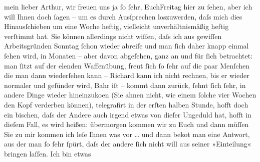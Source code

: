 \pstart{}mein lieber Arthur,\pend\vspace{0.5em}
\pstart
           wir freuen uns ja{ }ſo{ }ſehr, EuchFreitag hier zu{ }ſehen, aber ich will Ihnen doch{ }ſagen – um es durch
               Ausſprechen loszuwerden, daſs mich dies Hinausſchieben um eine Woche heftig,
               vielleicht unverhältnismäßig heftig verſtimmt hat. \label{OL450-1v}\label{OL450-1h}Sie können allerdings nicht wiſſen, {\pb}daſs ich aus gewiſſen
               Arbeitsgründen Sonntag{ }ſchon wieder abreiſe und man{ }ſich daher knapp
               einmal{ }ſehen wird, in Monaten – aber davon abgeſehen, ganz an und für{ }ſich
               betrachtet: man{ }ſitzt auf der elenden Waffenübung, freut{ }ſich{ }ſo{ }ſehr auf die paar
               Menſchen {\pb}die man dann wiederſehen
               kann – Richard kann ich nicht rechnen, bis er
               wieder normaler und geſünder wird, Bahr iſt
               \label{K_L01539-1v}\label{K_L01539-1} – kommt dann zurück,{ }ſehnt{ }ſich{ }ſehr, in andere Dinge
               wieder hineinzuko{\geminationm}en (Sie ahnen nicht, wie einem{ }ſolche
               vier Wochen den Kopf verderben können), telegrafirt {\pb}in der erſten halben Stunde, hofft
               doch ein bischen, daſs der Andere auch irgend etwas von dieſer Ungeduld hat, hofft in
               dieſem Fall, es wird heißen: übermorgen kommen wir zu Euch und dann müſſen Sie zu mir
               kommen ich leſe Ihnen was vor {\dots} und dann beko{\geminationm}t man eine Antwort, aus der man{ }ſo{ }ſehr{ }ſpürt, daſs der
               andere{ }ſich nicht will aus seiner »Einteilung« bringen laſſen. Ich bin etwas \label{T_L01539-1v}\label{T_L01539-1}\pend
